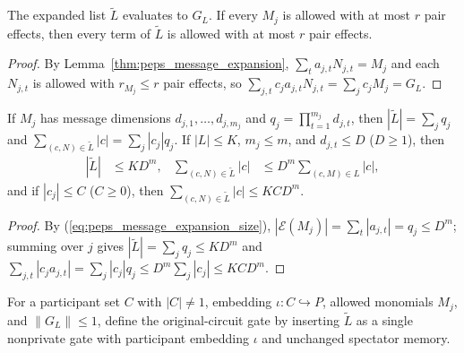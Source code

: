 \begin{lemma}
    \label{thm:peps_message_gate_eval}
    \leanok
    The expanded list $\widetilde L$ evaluates to $G_L$. If every $M_j$ is
    allowed with at most $r$ pair effects, then every term of $\widetilde L$ is
    allowed with at most $r$ pair effects.
\end{lemma}
\begin{proof}
    \leanok
    By Lemma~\ref{thm:peps_message_expansion},
    $\sum_t a_{j,t}N_{j,t}=M_j$ and each $N_{j,t}$ is allowed with $r_{M_j}\le r$
    pair effects, so $\sum_{j,t}c_ja_{j,t}N_{j,t}=\sum_j c_jM_j=G_L$.
\end{proof}

\begin{lemma}
    \label{thm:peps_message_gate_size}
    \leanok
    If $M_j$ has message dimensions $d_{j,1},\ldots,d_{j,m_j}$ and
    $q_j=\prod_{t=1}^{m_j}d_{j,t}$, then $|\widetilde L|=\sum_j q_j$ and
    $\sum_{(c,N)\in\widetilde L}|c|=\sum_j|c_j|q_j$. If $|L|\le K$,
    $m_j\le m$, and $d_{j,t}\le D$ ($D\ge 1$), then
    \begin{align}
        |\widetilde L| & \le KD^m,                    &
        \sum_{(c,N)\in\widetilde L}|c|
                       & \le D^m\sum_{(c,M)\in L}|c|,
        \label{eq:peps_message_gate_size}
    \end{align}
    and if $|c_j|\le C$ ($C\ge 0$), then $\sum_{(c,N)\in\widetilde L}|c|\le KCD^m$.
\end{lemma}
\begin{proof}
    \leanok
    By (\ref{eq:peps_message_expansion_size}), $|\mathcal E(M_j)|=\sum_t|a_{j,t}|=q_j\le D^m$;
    summing over $j$ gives $|\widetilde L|=\sum_j q_j\le KD^m$ and
    $\sum_{j,t}|c_ja_{j,t}|=\sum_j|c_j|q_j\le D^m\sum_j|c_j|\le KCD^m$.
\end{proof}

\begin{definition}
    \label{def:peps_message_gate_circuit}
    \leanok
    For a participant set $C$ with $|C|\ne1$, embedding $\iota:C\hookrightarrow P$,
    allowed monomials $M_j$, and $\|G_L\|\le1$, define the original-circuit gate
    by inserting $\widetilde L$ as a single nonprivate gate with participant
    embedding $\iota$ and unchanged spectator memory.
\end{definition}

